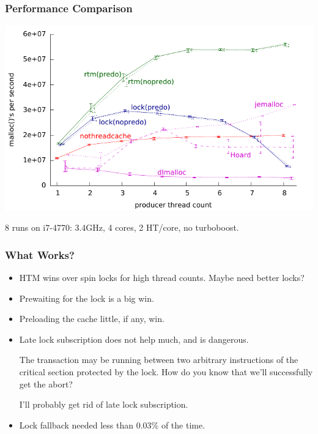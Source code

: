 \documentclass[xcolor=dvipsnames,14pt]{beamer}
\begin{document}
\begin{frame}
\frametitle{Performance Comparison}
\hspace*{-.7cm}\includegraphics{new-malloc-test-1K-aggregated.pdf}

{\small 8 runs on i7-4770: 3.4GHz, 4 cores, 2 HT/core, no turboboost.}
\end{frame}

\begin{frame}
\frametitle{What Works?}

\begin{itemize}
\item HTM wins over spin locks for high thread counts.  Maybe need better locks?
\item Prewaiting for the lock is a big win.
\item Preloading the cache little, if any, win.
\item Late lock subscription does not help much, and is dangerous.  

The transaction may be running between two arbitrary instructions of
the critical section protected by the lock.  How do you know that
we'll successfully get the abort?

I'll probably get rid of late lock subscription.
\item Lock fallback needed less than 0.03\% of the time.
\end{itemize}
\end{frame}
\end{document}
